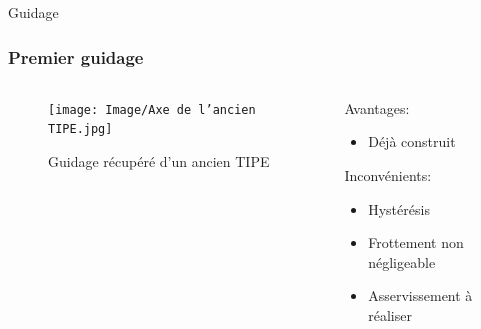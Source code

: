 \documentclass{beamer}
\begin{document}
	\begin{frame}{Guidage}
		\frametitle{Premier guidage}
 
		\begin{columns}
			\begin{column}{0.5\textwidth}
				\begin{figure}
					\texttt{[image: Image/Axe de l'ancien TIPE.jpg]}
					\caption{Guidage récupéré d'un ancien TIPE}
				\end{figure}
			\end{column}
			\begin{column}{0.5\textwidth}
				Avantages:
				\begin{itemize}
					\item Déjà construit
				\end{itemize}
				\vspace{12pt}
				Inconvénients:
				
				\begin{itemize}
					\item Hystérésis
					\item Frottement non négligeable
					\item Asservissement à réaliser
				\end{itemize}
			\end{column}
		\end{columns}
	\end{frame}
\end{document}
